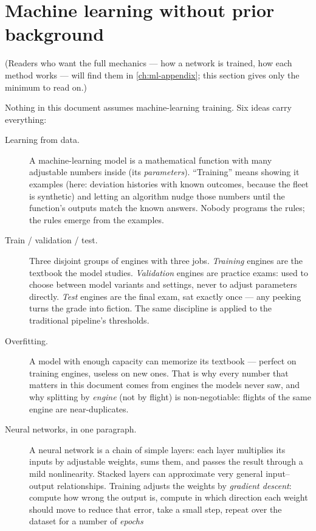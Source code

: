 \section{Machine learning without prior background}
\label{sec:ml-primer}

(Readers who want the full mechanics --- how a network is trained, how each method works ---
will find them in \cref{ch:ml-appendix}; this section gives only the minimum to read on.)

Nothing in this document assumes machine-learning training. Six ideas carry everything:

\begin{description}
  \item[Learning from data.] A machine-learning model is a mathematical function with many
    adjustable numbers inside (its \emph{parameters}). ``Training'' means showing it examples
    (here: deviation histories with known outcomes, because the fleet is synthetic) and
    letting an algorithm nudge those numbers until the function's outputs match the known
    answers. Nobody programs the rules; the rules emerge from the examples.
  \item[Train / validation / test.] Three disjoint groups of engines with three jobs.
    \emph{Training} engines are the textbook the model studies. \emph{Validation} engines
    are practice exams: used to choose between model variants and settings, never to adjust
    parameters directly. \emph{Test} engines are the final exam, sat exactly once --- any
    peeking turns the grade into fiction. The same discipline is applied to the traditional
    pipeline's thresholds.
  \item[Overfitting.] A model with enough capacity can memorize its textbook --- perfect on
    training engines, useless on new ones. That is why every number that matters in this
    document comes from engines the models never saw, and why splitting by \emph{engine}
    (not by flight) is non-negotiable: flights of the same engine are near-duplicates.
  \item[Neural networks, in one paragraph.] A neural network is a chain of simple layers:
    each layer multiplies its inputs by adjustable weights, sums them, and passes the result
    through a mild nonlinearity. Stacked layers can approximate very general input--output
    relationships. Training adjusts the weights by \emph{gradient descent}: compute how
    wrong the output is, compute in which direction each weight should move to reduce that
    error, take a small step, repeat over the dataset for a number of \emph{epochs}

\end{description}
